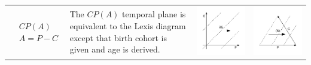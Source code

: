 \documentclass[12pt,oneside,letter]{article} %
\begin{document}
\begin{center}
\begin{longtable}{m{}m{}m{}m{}}
  \midrule
  $$\begin{aligned}
    &CP(A) \\
    &A = P - C
  \end{aligned}$$ &
  The $CP(A)$ temporal plane is equivalent to the Lexis diagram except that
  birth cohort is given and age is derived. &
  \includegraphics[width = \linewidth]{Figures/JonasTable/CPa.pdf} & \includegraphics[width = \linewidth]{Figures/JonasTable/CPa_iso.pdf}  \\

\end{longtable}
\end{center}
\end{document}
